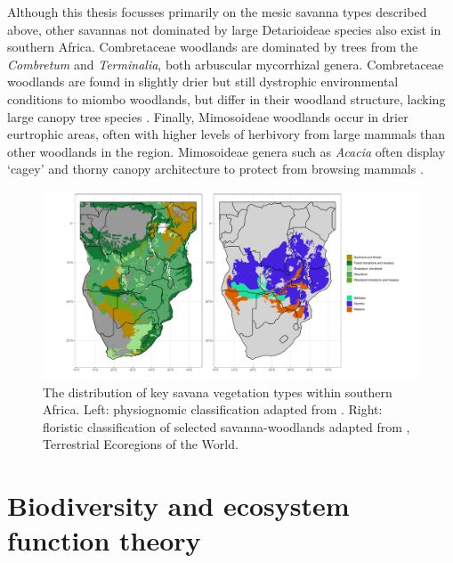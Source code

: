 \begin{refsection}
Although this thesis focusses primarily on the mesic savanna types described above, other savannas not dominated by large Detarioideae species also exist in southern Africa. Combretaceae woodlands are dominated by trees from the \textit{Combretum} and \textit{Terminalia}, both arbuscular mycorrhizal genera. Combretaceae woodlands are found in slightly drier but still dystrophic environmental conditions to miombo woodlands, but differ in their woodland structure, lacking large canopy tree species \citep{}. Finally, Mimosoideae woodlands occur in drier eurtrophic areas, often with higher levels of herbivory from large mammals than other woodlands in the region. Mimosoideae genera such as \textit{Acacia} often display `cagey' and thorny canopy architecture to protect from browsing mammals \citep{Maurin2014}. 

\begin{figure}[tb]
\centering
	\includegraphics[width=\textwidth]{img/saf_map_both}
	\caption[Map of savanna vegetation types in Southern Africa]{The distribution of key savana vegetation types within southern Africa. Left: physiognomic classification adapted from \citet{White1983}. Right: floristic classification of selected savanna-woodlands adapted from \citet{Dinerstein2017}, Terrestrial Ecoregions of the World.}
	\label{background:saf_map}
\end{figure}

\section{Biodiversity and ecosystem function theory}
\label{background:sec:befr_theory}


\end{refsection}
